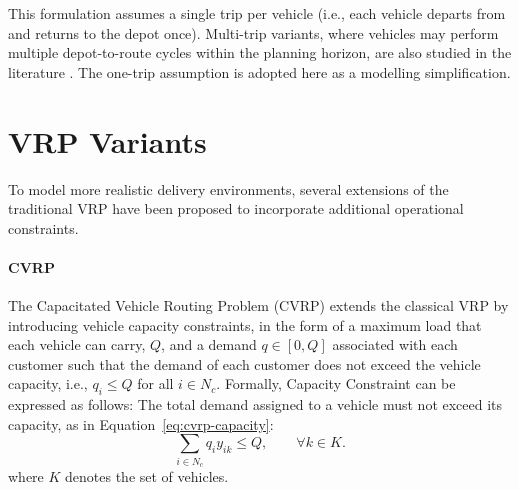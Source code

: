 This formulation assumes a single trip per vehicle (i.e., each vehicle departs
from and returns to the depot once). Multi-trip variants, where vehicles may
perform multiple depot-to-route cycles within the planning horizon, are also
studied in the literature \cite{meraliyevComprehensiveSurveyMethods2025}. The
one-trip assumption is adopted here as a modelling simplification.


\section{VRP Variants}
To model more realistic delivery environments, several extensions of the
traditional VRP have been proposed to incorporate additional operational
constraints.
\paragraph{CVRP}
The Capacitated Vehicle Routing Problem (CVRP) extends the classical VRP by
introducing vehicle capacity constraints, in the form of a maximum load that
each vehicle can carry, $Q$,  and a demand $q\in[0,Q]$ associated with each
customer such that the demand of each customer does not exceed the vehicle
capacity, i.e., $q_i \leq Q$ for all $i\in N_c$. Formally, Capacity Constraint
can be expressed as follows: The total demand assigned to a vehicle must not
exceed its capacity, as in Equation~\eqref{eq:cvrp-capacity}:
\begin{equation}
\label{eq:cvrp-capacity}
\sum_{i\in N_c} q_i y_{ik} \leq Q,
\qquad \forall k\in K.
\end{equation}
where $K$ denotes the set of vehicles.
